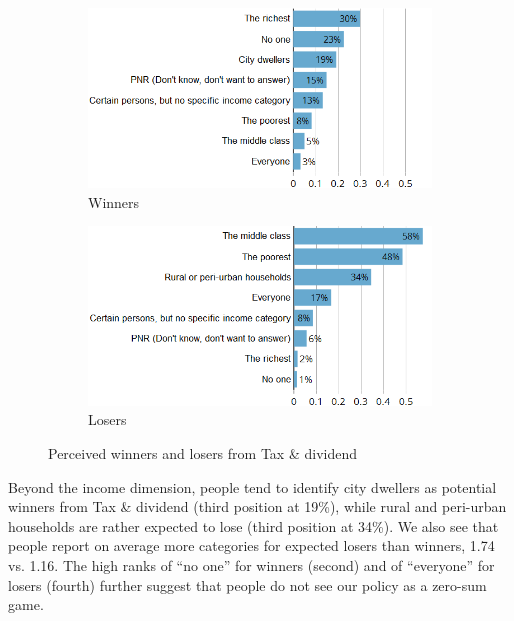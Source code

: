\documentclass[english,5p,authoryear]{elsarticle}
\begin{document}
\begin{figure}[t]
\centering
\begin{subfigure}[b]{\columnwidth}
   \caption{Winners}
   \includegraphics[width=\columnwidth]{Images/tax_winners_synchro.png}
\end{subfigure}

\begin{subfigure}[b]{\columnwidth}
\vspace{0.3cm}
   \caption{Losers}
   \includegraphics[width=\columnwidth]{Images/tax_losers_synchro.png}
\end{subfigure}
\caption{Perceived winners and losers from Tax \& dividend}
\label{fig:winners_losers}
\end{figure}

Beyond the income dimension, people tend to identify city dwellers as potential winners from Tax \& dividend (third position at 19\%), while rural and peri-urban households are rather expected to lose (third position at 34\%). We also see that people report on average more categories for expected losers than winners, 1.74 vs. 1.16. The high ranks of ``no one'' for winners (second) and of ``everyone'' for losers (fourth) further suggest that people do not see our policy as a zero-sum game. %
\end{document}
